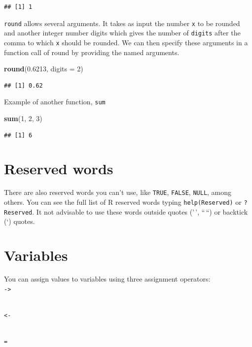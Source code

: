 \documentclass[
]{book}
\newenvironment{Shaded}{\begin{snugshade}}{\end{snugshade}}
\newcommand{\AttributeTok}[1]{\textcolor[rgb]{0.13,0.29,0.53}{#1}}
\newcommand{\DecValTok}[1]{\textcolor[rgb]{0.00,0.00,0.81}{#1}}
\newcommand{\FloatTok}[1]{\textcolor[rgb]{0.00,0.00,0.81}{#1}}
\newcommand{\FunctionTok}[1]{\textcolor[rgb]{0.13,0.29,0.53}{\textbf{#1}}}
\newcommand{\NormalTok}[1]{#1}
\begin{document}
\begin{verbatim}
## [1] 1
\end{verbatim}

\texttt{round} allows several arguments. It takes as input the number \texttt{x} to be rounded and another integer number digits which gives the number of \texttt{digits} after the comma to which \texttt{x} should be rounded. We can then specify these arguments in a function call of round by providing the named arguments.

\begin{Shaded}
\begin{Highlighting}[]
\FunctionTok{round}\NormalTok{(}\FloatTok{0.6213}\NormalTok{, }\AttributeTok{digits =} \DecValTok{2}\NormalTok{)}
\end{Highlighting}
\end{Shaded}

\begin{verbatim}
## [1] 0.62
\end{verbatim}

Example of another function, \texttt{sum}

\begin{Shaded}
\begin{Highlighting}[]
\FunctionTok{sum}\NormalTok{(}\DecValTok{1}\NormalTok{, }\DecValTok{2}\NormalTok{, }\DecValTok{3}\NormalTok{)}
\end{Highlighting}
\end{Shaded}

\begin{verbatim}
## [1] 6
\end{verbatim}

\hypertarget{reserved-words}{%
\section{Reserved words}\label{reserved-words}}

There are also reserved words you can't use, like \texttt{TRUE}, \texttt{FALSE}, \texttt{NULL}, among others. You can see the full list of R reserved words typing \texttt{help(Reserved)} or \texttt{?Reserved}. It not advisable to use these words outside quotes ('\,', ``\,``) or backtick (`) quotes.

\hypertarget{variables}{%
\section{Variables}\label{variables}}

You can assign values to variables using three assignment operators:\\
\texttt{-\textgreater{}}\strut \\
\texttt{\textless{}-}\strut \\
\texttt{=}
\end{document}
